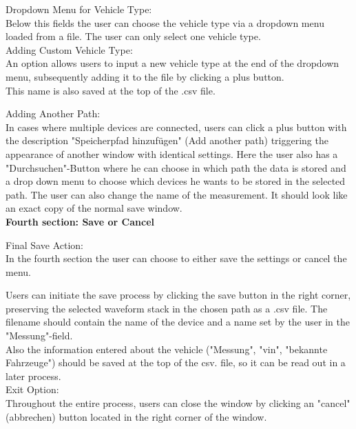 \documentclass[]{scrreprt}
\begin{document}
Dropdown Menu for Vehicle Type:\\

Below this fields the user can choose the vehicle type via a dropdown menu loaded from a file. The user can only select one vehicle type.\\

Adding Custom Vehicle Type:\\

An option allows users to input a new vehicle type at the end of the dropdown menu, subsequently adding it to the file by clicking a plus button.\\

This name is also saved at the top of the .csv file. 


Adding Another Path:\\

In cases where multiple devices are connected, users can click a plus button with the description "Speicherpfad hinzufügen" (Add another path) triggering the appearance of another window with identical settings. Here the user also has a "Durchsuchen"-Button where he can choose in which path the data is stored and a drop down menu to choose which devices he wants to be stored in the selected path. The user can also change the name of the measurement. It should look like an exact copy of the normal save window.\\

\textbf{Fourth section: Save or Cancel}

Final Save Action:\\
In the fourth section the user can choose to either save the settings or cancel the menu. 

Users can initiate the save process by clicking the save button in the right corner, preserving the selected waveform stack in the chosen path as a .csv file. The filename should contain the name of the device and a name set by the user in the "Messung"-field.\\
Also the information entered about the vehicle ("Messung", "vin", "bekannte Fahrzeuge") should be saved at the top of the csv. file, so it can be read out in a later process.\\

Exit Option:\\

Throughout the entire process, users can close the window by clicking an "cancel" (abbrechen) button located in the right corner of the window.\\
\end{document}
